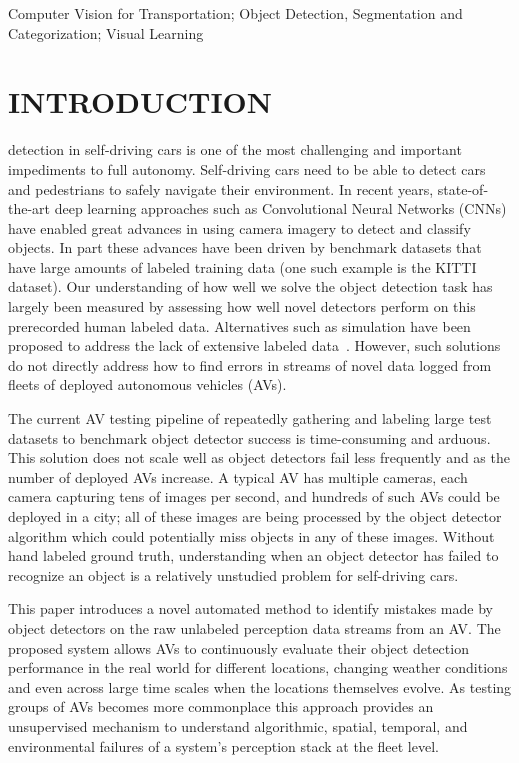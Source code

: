\documentclass[letterpaper, 10 pt, journal, twoside]{IEEEtran}  %
\begin{document}
\begin{IEEEkeywords}
Computer Vision for Transportation; Object Detection, Segmentation and Categorization; Visual Learning
\end{IEEEkeywords}

\section{INTRODUCTION}
 detection in self-driving cars is one of the most challenging and important impediments to full autonomy. Self-driving cars need to be able to detect cars and pedestrians to safely navigate
their environment. In recent years, state-of-the-art deep learning approaches such as 
Convolutional Neural Networks (CNNs) have enabled great advances in using camera imagery
to detect and classify objects. In part these advances have been driven by benchmark datasets that have large amounts of labeled training data (one such example is the KITTI~\cite{geiger2013vision} dataset). Our understanding of how well we solve the object detection task has largely been measured by assessing how well novel detectors perform on this prerecorded human labeled data. Alternatives such as simulation have been proposed to address the lack of extensive labeled data~\cite{johnson2017driving}. However, such solutions do not directly address how to find errors in streams of novel data logged from fleets of deployed autonomous vehicles (AVs).

The current AV testing pipeline of repeatedly gathering and labeling large test datasets to 
benchmark object detector success is time-consuming and arduous. This solution does not scale well as object detectors fail less frequently and as the number of deployed AVs increase. A typical AV has multiple cameras, each camera capturing tens of images per second, and hundreds of such AVs could be deployed in a city; all of these images are being processed by the object detector algorithm which could potentially miss objects in any of these images. 
Without hand labeled ground truth, understanding when an object detector has failed to recognize an object is a relatively unstudied problem for self-driving cars. 

This paper introduces a novel automated method to identify mistakes made by
object detectors on the raw unlabeled perception data streams from an AV. The proposed system allows AVs to continuously evaluate their object detection performance in the real world for different locations, changing weather conditions
and even across large time scales when the locations themselves evolve. As testing groups of AVs becomes more commonplace this approach provides an unsupervised mechanism to understand algorithmic, spatial, temporal, and environmental failures of a system's perception stack at the fleet level.
\end{document}
